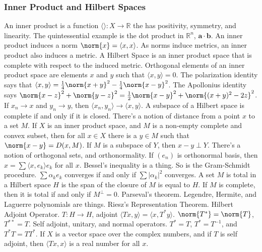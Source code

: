 \documentclass[crop=false,class=article,oneside]{standalone}
\begin{document}
        \subsubsection{Inner Product and Hilbert Spaces}
            An inner product is a function
            $\langle\rangle:X\rightarrow\mathbb{R}$ the has
            positivity, symmetry, and linearity. The
            quintessential example is the dot product in
            $\mathbb{R}^{n}$, $\mathbf{a}\cdot\mathbf{b}$. An inner
            product induces a norm $\norm{x}=\langle{x,x}\rangle$.
            As norms induce metrics, an inner product also induces a
            metric. A Hilbert Space is an inner product space that
            is complete with respect to the induced metric.
            Orthogonal elements of an inner product space are elements
            $x$ and $y$ such that $\langle{x,y}\rangle=0$. The
            polarization identity says that
            $\langle{x,y}\rangle=\frac{1}{4}\norm{x+y}^{2}%
             -\frac{1}{4}\norm{x-y}^{2}$. The Apollonius identity says
            $\norm{x-z}^{2}+\norm{y-z}^{2}=%
             \frac{1}{2}\norm{x-y}^{2}+\norm{(x+y)^{2}-2z}^{2}$.
            If $x_{n}\rightarrow{x}$ and $y_{n}\rightarrow{y}$, then
            $\langle{x_{n},y_{n}}\rangle\rightarrow\langle{x,y}\rangle$.
            A subspace of a Hilbert space is complete if and only if
            it is closed. There's a notion of distance from a point $x$
            to a set $M$. If $X$ is an inner product space, and $M$ is a
            non-empty complete and convex subset, then for all
            $x\in{X}$ there is a $y\in{M}$ such that
            $\norm{x-y}=D(x,M)$. If $M$ is a subspace of $Y$, then
            $x-y\perp{Y}$. There's a notion of orthogonal sets,
            and orthonormality. If $(e_{n})$ is orthonormal basis, then
            $x=\sum\langle{x,e_{k}}\rangle{e_{k}}$ for all $x$.
            Bessel's inequality is a thing. So is the Gram-Schmidt
            procedure. $\sum\alpha_{k}e_{k}$ converges if and only if
            $\sum|\alpha_{k}|^{2}$ converges. A set $M$ is total in
            a Hilbert space $H$ is the span of the closure of $M$ is equal
            to $H$. If $M$ is complete, then it is 
            total if and only if $M^{\perp}=0$. Parseval's theorem.
            Legendre, Hermite, and Laguerre polynomials are things.
            Riesz's Representation Theorem.
            Hilbert Adjoint Operator. $T:H\rightarrow{H}$,
            adjoint $\langle{Tx,y}\rangle=\langle{x,T^{*}y}\rangle$.
            $\norm{T^{*}}=\norm{T}$, $T^{**}=T$.
            Self adjoint, unitary, and normal operators.
            $T^{*}=T$, $T^{*}=T^{-1}$, and $T^{*}T=TT^{*}$. If
            $X$ is a vector space over the complex numbers,
            and if $T$ is self adjoint, then
            $\langle{Tx,x}\rangle$ is a real number for all $x$.
\end{document}
